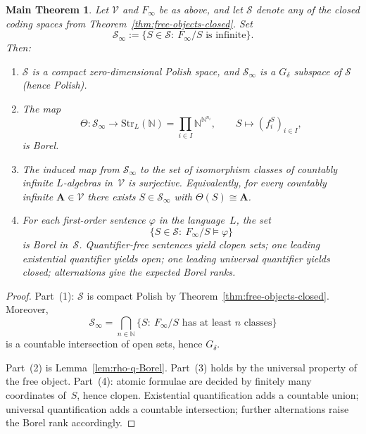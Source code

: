 \documentclass[12pt,fleqn,a4paper]{amsart}
\numberwithin{equation}{section}
\newtheorem{mainthm}[theorem]{Main Theorem}
\theoremstyle{definition}
\newcommand{\N}{\mathbb{N}}
\begin{document}
\begin{mainthm}\label{thm:countable-main}
Let $\mathcal V$ and $F_\infty$ be as above, and let $\mathcal S$ denote any of the
closed coding spaces from Theorem~\ref{thm:free-objects-closed}.
Set
\[
\mathcal S_\infty:=\{S\in\mathcal S:\ F_\infty/S\text{ is infinite}\}.
\]
Then:
\begin{enumerate}
\item $\mathcal S$ is a compact zero-dimensional Polish space, and $\mathcal S_\infty$
is a $G_\delta$ subspace of $\mathcal S$ (hence Polish).

\item The map
\[
\Theta:\mathcal S_\infty\to \mathrm{Str}_L(\N)=\prod_{i\in I}\N^{\N^{n_i}},
\qquad
S\mapsto (f_i^S)_{i\in I},
\]
is Borel.

\item The induced map from $\mathcal S_\infty$ to the set of isomorphism classes
of countably infinite $L$-algebras in~$\mathcal V$ is surjective.  Equivalently,
for every countably infinite $\mathbf A\in\mathcal V$ there exists
$S\in\mathcal S_\infty$ with $\Theta(S)\cong \mathbf A$.

\item For each first-order sentence $\varphi$ in the language~$L$, the set
\[
\{S\in\mathcal S:\ F_\infty/S\models\varphi\}
\]
is Borel in~$\mathcal S$.
Quantifier-free sentences yield clopen sets; one leading existential quantifier
yields open; one leading universal quantifier yields closed; alternations give the
expected Borel ranks.
\end{enumerate}
\end{mainthm}

\begin{proof}
Part~(1): $\mathcal S$ is compact Polish by Theorem~\ref{thm:free-objects-closed}.
Moreover,
\[
\mathcal S_\infty
=\bigcap_{n\in\N}\{S:\ F_\infty/S\text{ has at least }n\text{ classes}\}
\]
is a countable intersection of open sets, hence $G_\delta$.

Part~(2) is Lemma~\ref{lem:rho-q-Borel}.
Part~(3) holds by the universal property of the free object.
Part~(4): atomic formulae are decided by finitely many coordinates of~$S$,
hence clopen.  Existential quantification adds a countable union; universal
quantification adds a countable intersection; further alternations raise the Borel rank accordingly.
\end{proof}
\end{document}
